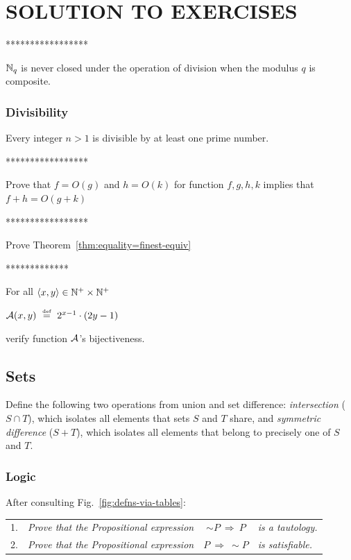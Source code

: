 
\chapter{SOLUTION TO EXERCISES}
\label{ch:Exercises}


*****************

$\mathbb{N}_q$ is never closed under the operation of division when the modulus $q$ is composite.

\subsection{Divisibility}

Every integer $n>1$ is divisible by at least one prime number.

*****************

Prove that $f = O(g)$ and $h = O(k)$ for function $f,g,h,k$ implies that
$f+h = O(g+k)$

*****************

Prove Theorem~\ref{thm:equality=finest-equiv}

*************

For all $\langle x,y \rangle \in \mathbb{N}^+ \times \mathbb{N}^+$

$\mbox{$\cal A$}(x,y) \ \stackrel{\mbox{{\tiny def}}}{=} \ 2^{x-1} \cdot (2y -1)$

verify function $\mbox{$\cal A$}$'s
bijectiveness.



\section{Sets}

Define the following two operations from union and set
difference: {\it intersection} ($S \cap T$), which isolates all
elements that sets $S$ and $T$ share, and {\it symmetric difference}
($S+T$), which isolates all elements that belong to precisely one of
$S$ and $T$.


\subsection{Logic}

After consulting Fig.~\ref{fig:defns-via-tables}:

\begin{tabular}{llcl}
1. &
{\it Prove that the Propositional expression} &
$\sim P \ \Rightarrow \ P$ &
{\it is a tautology.} \\
2. &
{\it Prove that the Propositional expression} &
$P \ \Rightarrow \ \sim P$ &
{\it is satisfiable.}
\end{tabular}



